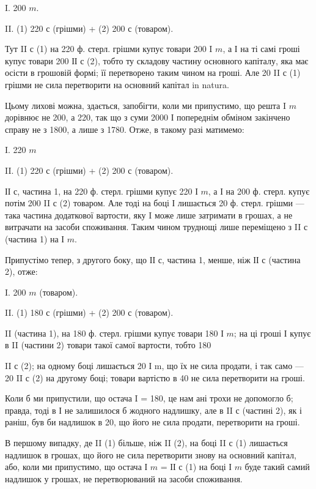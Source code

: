 
I.    200 $m$.

II. (1) 220 $с$ (грішми) + (2) 200 $с$ (товаром).

Тут II $с$ (1) на 220 ф. стерл. грішми купує товари 200 I $m$, а І на
ті самі гроші купує товари 200 ІІ $с$ (2), тобто ту складову частину
основного капіталу, яка має осісти в грошовій формі; її перетворено
таким чином на гроші. Але 20 II $с$ (1) грішми не сила перетворити на
основний капітал in natura.

Цьому лихові можна, здається, запобігти, коли ми припустимо, що решта
I $m$ дорівнює не 200, а 220, так що з суми 2000 І попереднім обміном закінчено
справу не з 1800, а лише з 1780. Отже, в такому разі матимемо:

I.    220 $m$

II. (1) 220 $с$ (грішми) + (2) 200 $с$ (товаром).

ІІ $с$, частина 1, на 220 ф. стерл. грішми купує 220 І $m$, а І на
200 ф. стерл. купує потім 200 II $с$ (2) товаром. Але тоді на боці І
лишається 20 ф. стерл. грішми — така частина додаткової вартости, яку
I може лише затримати в грошах, а не витрачати на засоби споживання.
Таким чином труднощі лише переміщено з II $с$ (частина 1) на І $m$.

Припустімо тепер, з другого боку, що ІІ $с$, частина 1, менше, ніж ІІ $с$
(частина 2), отже:


I.    200 $m$ (товаром).

II. (1) 180 $с$ (грішми) + (2) 200 $с$ (товаром).

II (частина 1), на 180 ф. стерл. грішми купує товари 180 І $m$; на ці
гроші І купує в II (частини 2) товари такої самої вартости, тобто 180

II    $с$ (2); на одному боці лишається 20 І m, що їх не сила продати, і так
само — 20 II с (2) на другому боці; товари вартістю в 40 не сила перетворити
на гроші.

Коли б ми припустили, що остача I = 180, це нам ані трохи не допомогло
б; правда, тоді в І не залишилося б жодного надлишку, але в II $с$
(частині 2), як і раніш, був би надлишок в 20, що його не сила продати,
перетворити на гроші.

В першому випадку, де II (1) більше, ніж II (2), на боці II $с$ (1)
лишається надлишок в грошах, що його не сила перетворити знову на
основний капітал, або, коли ми припустимо, що остача І $m$ = ІІ $с$ (1) на
боці І $m$ буде такий самий надлишок у грошах, не перетворюваний на
засоби споживання.

